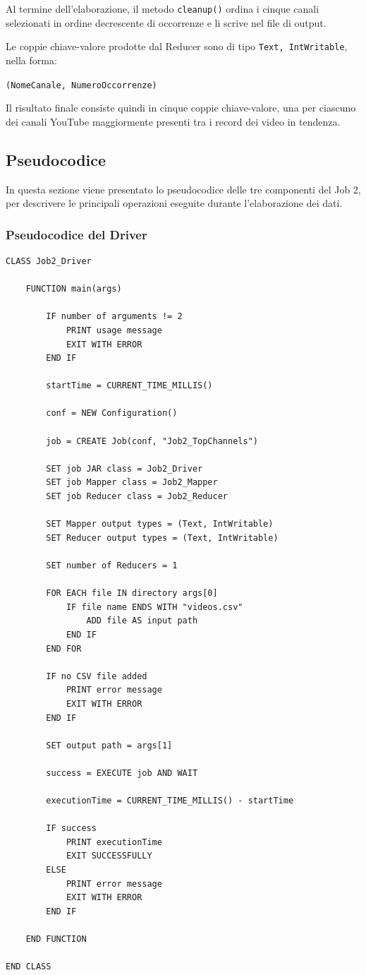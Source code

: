 \documentclass[12pt, a4paper]{article}
\begin{document}
Al termine dell'elaborazione, il metodo
\texttt{cleanup()} ordina i cinque canali
selezionati in ordine decrescente di occorrenze
e li scrive nel file di output.

Le coppie chiave-valore prodotte dal Reducer
sono di tipo \texttt{Text, IntWritable}, nella forma:

\begin{center}
    \texttt{(NomeCanale, NumeroOccorrenze)}
\end{center}

Il risultato finale consiste quindi in cinque
coppie chiave-valore, una per ciascuno dei
canali YouTube maggiormente presenti tra
i record dei video in tendenza.

\subsection{Pseudocodice}

In questa sezione viene presentato lo pseudocodice
delle tre componenti del Job 2, per descrivere
le principali operazioni eseguite durante
l'elaborazione dei dati.

\subsubsection{Pseudocodice del Driver}

\begin{verbatim}
CLASS Job2_Driver

    FUNCTION main(args)

        IF number of arguments != 2
            PRINT usage message
            EXIT WITH ERROR
        END IF

        startTime = CURRENT_TIME_MILLIS()

        conf = NEW Configuration()

        job = CREATE Job(conf, "Job2_TopChannels")

        SET job JAR class = Job2_Driver
        SET job Mapper class = Job2_Mapper
        SET job Reducer class = Job2_Reducer

        SET Mapper output types = (Text, IntWritable)
        SET Reducer output types = (Text, IntWritable)

        SET number of Reducers = 1

        FOR EACH file IN directory args[0]
            IF file name ENDS WITH "videos.csv"
                ADD file AS input path
            END IF
        END FOR

        IF no CSV file added
            PRINT error message
            EXIT WITH ERROR
        END IF

        SET output path = args[1]

        success = EXECUTE job AND WAIT

        executionTime = CURRENT_TIME_MILLIS() - startTime

        IF success
            PRINT executionTime
            EXIT SUCCESSFULLY
        ELSE
            PRINT error message
            EXIT WITH ERROR
        END IF

    END FUNCTION

END CLASS
\end{verbatim}
\end{document}

